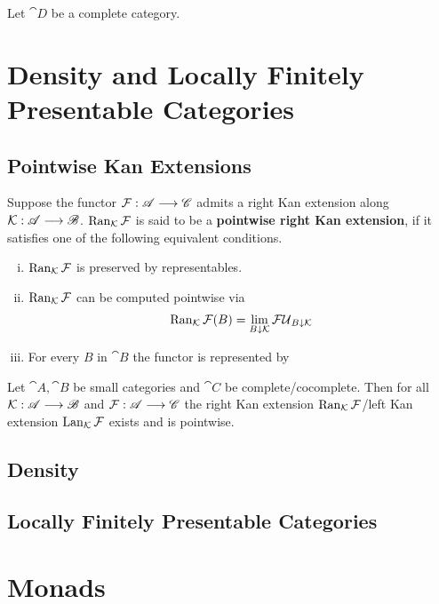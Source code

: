 	\begin{theorem}
		Let $\cat{D}$ be a complete category. 
	\end{theorem}

	\newpage
	\section{Density and Locally Finitely Presentable Categories}
	\subsection{Pointwise Kan Extensions}

	\begin{definition}
		Suppose the functor $\mathcal{F}:\mathscr{A} --> \mathscr{C}$ admits a right Kan extension along $\mathcal{K}:\mathscr{A} --> \mathscr{B}$. $\operatorname{Ran}_{\mathcal{K}}\mathcal{F}$ is said to be a \textbf{pointwise right Kan extension}, if it satisfies one of the following equivalent conditions.
		\begin{enumerate}[(i)]
			\item{
				$\operatorname{Ran}_{\mathcal{K}}\mathcal{F}$ is preserved by representables.
			}
			\item{
				$\operatorname{Ran}_{\mathcal{K}}\mathcal{F}$ can be computed pointwise via
				\begin{align*}
					\operatorname{Ran}_{\mathcal{K}}\mathcal{F}(B) = \lim_{B \downarrow \mathcal{K}} \mathcal{FU}_{B \downarrow \mathcal{K}}
				\end{align*}
			}
			\item{
				For every $B$ in $\cat{B}$ the functor  is represented by 
			}
		\end{enumerate}
	\end{definition}

	\begin{lemma}
		Let $\cat{A},\cat{B}$ be small categories and $\cat{C}$ be complete/cocomplete. Then for all $\mathcal{K}:\mathscr{A} --> \mathscr{B}$ and $\mathcal{F}:\mathscr{A}-->\mathscr{C}$ the right Kan extension $\operatorname{Ran}_{\mathcal{K}}\mathcal{F}$/left Kan extension $\operatorname{Lan}_{\mathcal{K}}\mathcal{F}$ exists and is pointwise.
	\end{lemma}

	\subsection{Density}

	\subsection{Locally Finitely Presentable Categories}

	\newpage
	\section{Monads}
